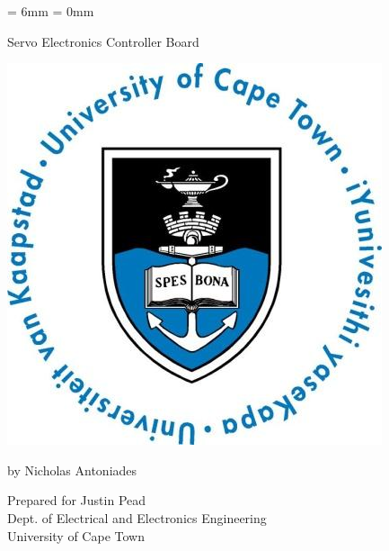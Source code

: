 \documentclass[a4paper,12pt]{report}
\begin{document}
\parskip = 6mm
\parindent = 0mm
\renewcommand{\headrulewidth}{0pt}
\rhead[]{\thesection}
\lhead[\thechapter]{}


\newcommand{\hsp}{\hspace{20pt}}
\titleformat{\chapter}[hang]{\vspace{-20mm}\Huge\bfseries}{\thechapter\hsp\textcolor{gray75}{|}\hsp}{0pt}{\Huge\bfseries}

\thispagestyle{empty}
{\Huge \begin{center}
Servo Electronics Controller Board
\end{center}}

\vskip 5mm
\begin{center}
\includegraphics[scale = 0.3]{uctLogo.png}
\end{center}

\vskip 5mm
\begin{center}
by Nicholas Antoniades		%
\end{center}

\vskip 5mm
\begin{center}
Prepared for Justin Pead\\ 		%
Dept. of Electrical and Electronics Engineering\\University of Cape Town
\end{center}
\end{document}
